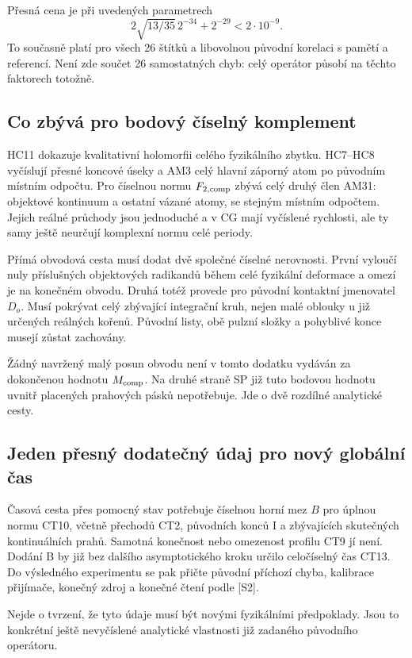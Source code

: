 \documentclass[11pt,a4paper]{article}
\theoremstyle{remark}\newtheorem{remark}[theorem]{Poznámka}
\numberwithin{equation}{section}
\begin{document}
Přesná cena je při uvedených parametrech
\[
2\sqrt{13/35}\,2^{-34}+2^{-29}<2\cdot10^{-9}.
\]
To současně platí pro všech 26 štítků a libovolnou původní
korelaci s pamětí a referencí. Není zde součet 26 samostatných
chyb: celý operátor působí na těchto faktorech totožně.

\subsection{Co zbývá pro bodový číselný komplement}

HC11 dokazuje kvalitativní holomorfii celého fyzikálního zbytku.
HC7--HC8 vyčíslují přesné koncové úseky a AM3 celý hlavní
záporný atom po původním místním odpočtu. Pro číselnou normu
\(F_{2,\rm comp}\) zbývá celý druhý člen AM31:
objektové kontinuum a ostatní vázané atomy, se stejným místním
odpočtem. Jejich reálné průchody jsou jednoduché a v CG mají
vyčíslené rychlosti, ale ty samy ještě neurčují komplexní
normu celé periody.

Přímá obvodová cesta musí dodat dvě společné číselné nerovnosti.
První vyloučí nuly příslušných objektových radikandů během
celé fyzikální deformace a omezí je na konečném obvodu.
Druhá totéž provede pro původní kontaktní jmenovatel \(D_o\).
Musí pokrývat celý zbývající integrační kruh, nejen malé
oblouky u již určených reálných kořenů. Původní listy, obě
pulzní složky a pohyblivé konce musejí zůstat zachovány.

Žádný navržený malý posun obvodu není v tomto dodatku
vydáván za dokončenou hodnotu \(M_{\rm comp}\).
Na druhé straně SP již tuto bodovou hodnotu uvnitř placených
prahových pásků nepotřebuje. Jde o dvě rozdílné analytické cesty.

\subsection{Jeden přesný dodatečný údaj pro nový globální čas}

Časová cesta přes pomocný stav potřebuje číselnou horní mez
\(B\) pro úplnou normu CT10, včetně přechodů CT2, původních
konců I a zbývajících skutečných kontinuálních prahů.
Samotná konečnost nebo omezenost profilu CT9 jí není.
Dodání B by již bez dalšího asymptotického kroku určilo
celočíselný čas CT13. Do výsledného experimentu se pak
přičte původní příchozí chyba, kalibrace přijímače,
konečný zdroj a konečné čtení podle [S2].

Nejde o tvrzení, že tyto údaje musí být novými fyzikálními
předpoklady. Jsou to konkrétní ještě nevyčíslené analytické
vlastnosti již zadaného původního operátoru.
\end{document}
